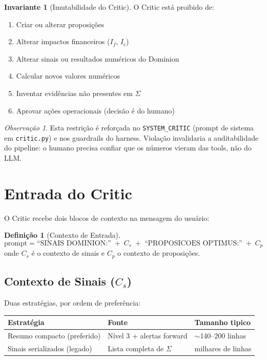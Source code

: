 \documentclass[a4paper, 12pt]{report}
\theoremstyle{definition}
\newtheorem{definicao}{Defini\c{c}\~ao}[chapter]
\newtheorem{invariante}{Invariante}[chapter]
\theoremstyle{remark}
\newtheorem{observacao}{Observa\c{c}\~ao}[chapter]
\begin{document}
\begin{invariante}[Imutabilidade do Critic]
  O Critic est\'a proibido de:
  \begin{enumerate}
    \item Criar ou alterar proposi\c{c}\~oes
    \item Alterar impactos financeiros ($I_f$, $I_c$)
    \item Alterar sinais ou resultados num\'ericos do Dominion
    \item Calcular novos valores num\'ericos
    \item Inventar evid\^encias n\~ao presentes em $\Sigma$
    \item Aprovar a\c{c}\~oes operacionais (decis\~ao \'e do humano)
  \end{enumerate}
\end{invariante}

\begin{observacao}
  Esta restri\c{c}\~ao \'e refor\c{c}ada no \texttt{SYSTEM\_CRITIC}
  (prompt de sistema em \texttt{critic.py}) e nos guardrails do harness.
  Viola\c{c}\~ao invalidaria a auditabilidade do pipeline: o humano
  precisa confiar que os n\'umeros vieram das tools, n\~ao do LLM.
\end{observacao}


\section{Entrada do Critic}

O Critic recebe dois blocos de contexto na mensagem do usu\'ario:

\begin{definicao}[Contexto de Entrada]
  \[
    \text{prompt} = \text{``SINAIS DOMINION:''} \;+\; C_s
    \;+\; \text{``PROPOSICOES OPTIMUS:''} \;+\; C_p
  \]
  onde $C_s$ \'e o contexto de sinais e $C_p$ o contexto de proposi\c{c}\~oes.
\end{definicao}

\subsection{Contexto de Sinais ($C_s$)}

Duas estrat\'egias, por ordem de prefer\^encia:

\begin{center}
\begin{tabular}{llp{5.5cm}}
  \toprule
  \textbf{Estrat\'egia} & \textbf{Fonte} & \textbf{Tamanho tipico} \\
  \midrule
  Resumo compacto (preferido) & N\'ivel 3 + alertas forward & $\sim$140--200 linhas \\
  Sinais serializados (legado) & Lista completa de $\Sigma$ & milhares de linhas \\
  \bottomrule
\end{tabular}
\end{center}
\end{document}

